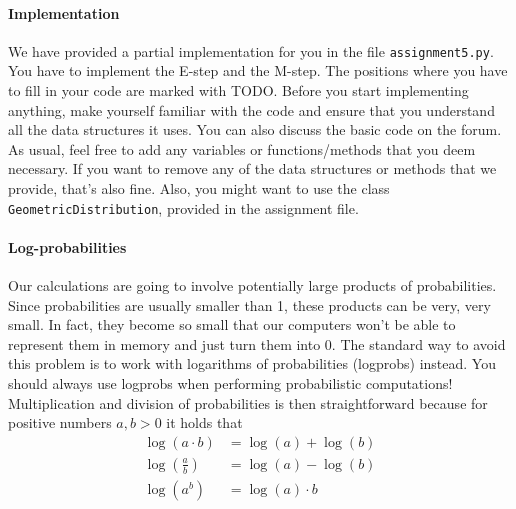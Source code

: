 \documentclass[11pt, a4paper]{article}
\begin{document}
\paragraph{Implementation}

We have provided a partial implementation for you in the file \texttt{assignment5.py}. 
You have to implement the E-step and the M-step. The positions where you have to fill in your code are marked with TODO. Before you start implementing anything,
make yourself familiar with the code and ensure that you understand all the data structures it uses. You can also discuss the basic code on the forum. As usual, feel
free to add any variables or functions/methods that you deem necessary. If you want to remove any of the data structures or methods that we provide, that's also fine.
Also, you might want to use the class \texttt{GeometricDistribution}, provided in the assignment file.


\paragraph{Log-probabilities}

Our calculations are going to involve potentially large products of probabilities. Since
probabilities are usually smaller than 1, these products can be very, very small. In fact, they become so small that our computers won't be able to 
represent them in memory and just turn them into 0.
The standard way to avoid this problem is to work with logarithms of probabilities (logprobs) instead. You should always use logprobs when performing
probabilistic computations! Multiplication and division of probabilities is then straightforward because for positive numbers $ a,b > 0 $ it holds that
\begin{align*}
\log(a \cdot b) &= \log(a) + \log(b) \\
\log\left( \frac{a}{b} \right) &= \log(a) - \log(b) \\
\log\left( a^{b} \right) &= \log(a) \cdot b
\end{align*}
\end{document}
